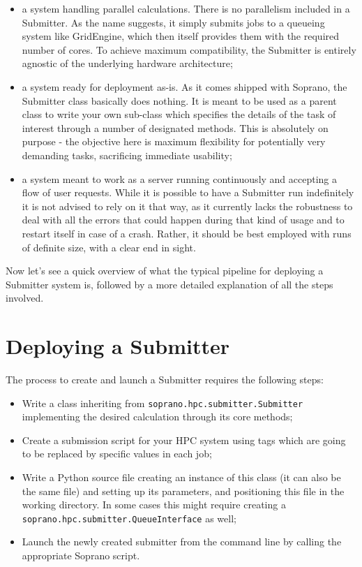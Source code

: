 \documentclass[]{report}
\begin{document}
\begin{itemize}
	\item a system handling parallel calculations. There is no parallelism included in a Submitter. As the name suggests, it simply submits jobs to a queueing system like GridEngine, which then itself provides them with the required number of cores. To achieve maximum compatibility, the Submitter is entirely agnostic of the underlying hardware architecture;
	\item a system ready for deployment as-is. As it comes shipped with Soprano, the Submitter class basically does nothing. It is meant to be used as a parent class to write your own sub-class which specifies the details of the task of interest through a number of designated methods. This is absolutely on purpose - the objective here is maximum flexibility for potentially very demanding tasks, sacrificing immediate usability;
	\item a system meant to work as a server running continuously and accepting a flow of user requests. While it is possible to have a Submitter run indefinitely it is not advised to rely on it that way, as it currently lacks the robustness to deal with all the errors that could happen during that kind of usage and to restart itself in case of a crash. Rather, it should be best employed with runs of definite size, with a clear end in sight.
\end{itemize}

Now let's see a quick overview of what the typical pipeline for deploying a Submitter system is, followed by a more detailed explanation of all the steps involved.

\chapter{Deploying a Submitter}

The process to create and launch a Submitter requires the following steps:

\begin{itemize}
	\item Write a class inheriting from \lstinline|soprano.hpc.submitter.Submitter| implementing the desired calculation through its core methods;
	\item Create a submission script for your HPC system using tags which are going to be replaced by specific values in each job;
	\item Write a Python source file creating an instance of this class (it can also be the same file) and setting up its parameters, and positioning this file in the working directory. In some cases this might require creating a \lstinline|soprano.hpc.submitter.QueueInterface| as well;
	\item Launch the newly created submitter from the command line by calling the appropriate Soprano script.
\end{itemize}
\end{document}
